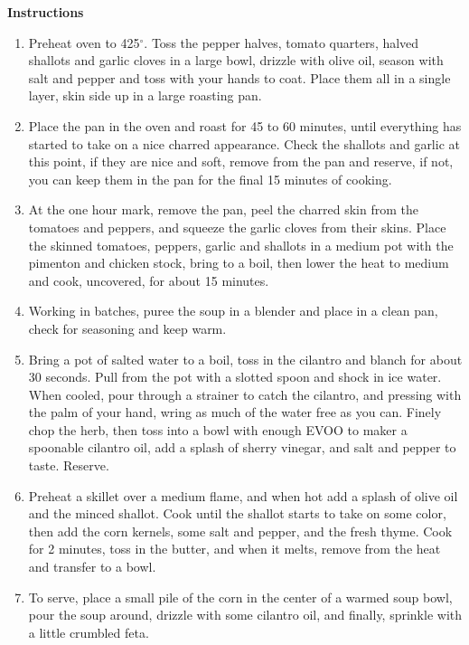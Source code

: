 \documentclass{article}
\numberwithin{figure}{section}
\numberwithin{equation}{section}
\begin{document}
{\bf Instructions}
\begin{enumerate}
\item Preheat oven to 425$^{\circ}$. Toss the pepper halves, tomato quarters, halved shallots and garlic cloves in a large bowl, drizzle with olive oil, season with salt and pepper and toss with your hands to coat. Place them all in a single layer, skin side up in a large roasting pan.
\item Place the pan in the oven and roast for 45 to 60 minutes, until everything has started to take on a nice charred appearance. Check the shallots and garlic at this point, if they are nice and soft, remove from the pan and reserve, if not, you can keep them in the pan for the final 15 minutes of cooking.
\item At the one hour mark, remove the pan, peel the charred skin from the tomatoes and peppers, and squeeze the garlic cloves from their skins. Place the skinned tomatoes, peppers, garlic and shallots in a medium pot with the pimenton and chicken stock, bring to a boil, then lower the heat to medium and cook, uncovered, for about 15 minutes.
\item Working in batches, puree the soup in a blender and place in a clean pan, check for seasoning and keep warm.
\item Bring a pot of salted water to a boil, toss in the cilantro and blanch for about 30 seconds. Pull from the pot with a slotted spoon and shock in ice water. When cooled, pour through a strainer to catch the cilantro, and pressing with the palm of your hand, wring as much of the water free as you can. Finely chop the herb, then toss into a bowl with enough EVOO to maker a spoonable cilantro oil, add a splash of sherry vinegar, and salt and pepper to taste. Reserve.
\item Preheat a skillet over a medium flame, and when hot add a splash of olive oil and the minced shallot. Cook until the shallot starts to take on some color, then add the corn kernels, some salt and pepper, and the fresh thyme. Cook for 2 minutes, toss in the butter, and when it melts, remove from the heat and transfer to a bowl.
\item To serve, place a small pile of the corn in the center of a warmed soup bowl, pour the soup around, drizzle with some cilantro oil, and finally, sprinkle with a little crumbled feta.
\end{enumerate}


\pagebreak
\end{document}
